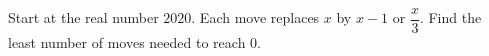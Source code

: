 Start at the real number $2020$. Each move replaces $x$ by $x-1$ or $\dfrac{x}{3}$. Find the least number of moves needed to reach $0$.
